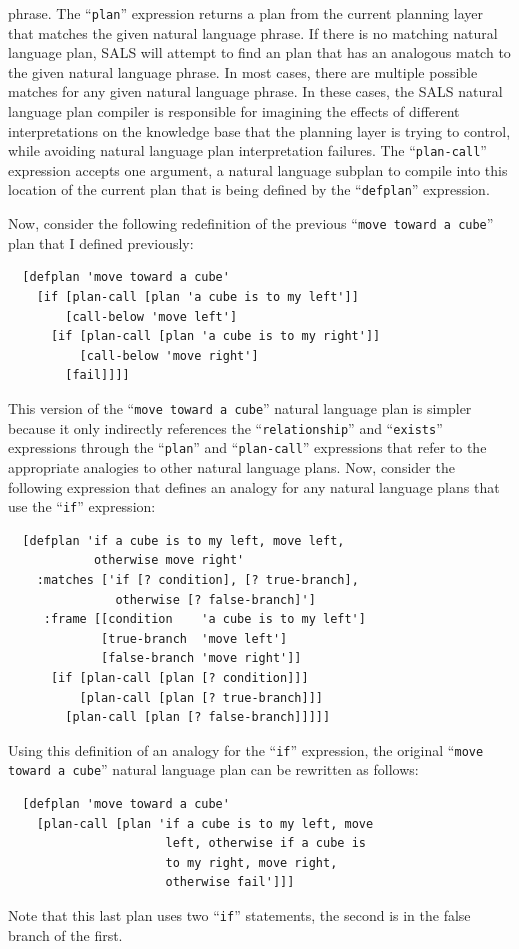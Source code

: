 phrase.  The ``{\tt{plan}}'' expression returns a plan from the
current planning layer that matches the given natural language phrase.
If there is no matching natural language plan, SALS will attempt to
find an plan that has an analogous match to the given natural language
phrase.  In most cases, there are multiple possible matches for any
given natural language phrase.  In these cases, the SALS natural
language plan compiler is responsible for imagining the effects of
different interpretations on the knowledge base that the planning
layer is trying to control, while avoiding natural language plan
interpretation failures.  The ``{\tt{plan-call}}'' expression accepts
one argument, a natural language subplan to compile into this location
of the current plan that is being defined by the ``{\tt{defplan}}''
expression.

Now, consider the following redefinition of the previous ``{\tt{move
    toward a cube}}'' plan that I defined previously:
\begin{samepage}
\begin{Verbatim}
  [defplan 'move toward a cube'
    [if [plan-call [plan 'a cube is to my left']]
        [call-below 'move left']
      [if [plan-call [plan 'a cube is to my right']]
          [call-below 'move right']
        [fail]]]]
\end{Verbatim}
\end{samepage}
This version of the ``{\tt{move toward a cube}}'' natural language
plan is simpler because it only indirectly references the
``{\tt{relationship}}'' and ``{\tt{exists}}'' expressions through the
``{\tt{plan}}'' and ``{\tt{plan-call}}'' expressions that refer to the
appropriate analogies to other natural language plans.  Now, consider
the following expression that defines an analogy for any natural
language plans that use the ``{\tt{if}}'' expression:
\begin{samepage}
\begin{Verbatim}
  [defplan 'if a cube is to my left, move left,
            otherwise move right'
    :matches ['if [? condition], [? true-branch],
               otherwise [? false-branch]']
     :frame [[condition    'a cube is to my left']
             [true-branch  'move left']
             [false-branch 'move right']]
      [if [plan-call [plan [? condition]]]
          [plan-call [plan [? true-branch]]]
        [plan-call [plan [? false-branch]]]]]
\end{Verbatim}
\end{samepage}
Using this definition of an analogy for the ``{\tt{if}}'' expression,
the original ``{\tt{move toward a cube}}'' natural language plan can
be rewritten as follows:
\begin{samepage}
\begin{Verbatim}
  [defplan 'move toward a cube'
    [plan-call [plan 'if a cube is to my left, move
                      left, otherwise if a cube is
                      to my right, move right,
                      otherwise fail']]]
\end{Verbatim}
\end{samepage}
Note that this last plan uses two ``{\tt{if}}'' statements, the second
is in the false branch of the first.


